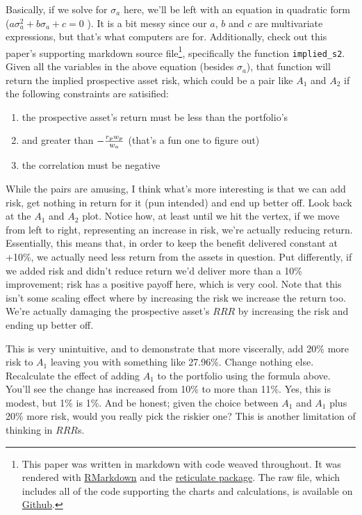 \documentclass[]{article}
\providecommand{\tightlist}{%
  \setlength{\itemsep}{0pt}\setlength{\parskip}{0pt}}
\let\rmarkdownfootnote\footnote%
\def\footnote{\protect\rmarkdownfootnote}
\begin{document}
Basically, if we solve for \(\sigma_a\) here, we'll be left with an
equation in quadratic form (\(a\sigma_a^2 + b\sigma_a + c = 0\) ). It is
a bit messy since our \(a\), \(b\) and \(c\) are multivariate
expressions, but that's what computers are for. Additionally, check out
this paper's supporting markdown source file\footnote{This paper was
  written in markdown with code weaved throughout. It was rendered with
  \href{https://rmarkdown.rstudio.com/}{RMarkdown} and the
  \href{https://rstudio.github.io/reticulate/}{reticulate package}. The
  raw file, which includes all of the code supporting the charts and
  calculations, is available on
  \href{https://github.com/cjken/portfolio-intuition}{Github}.},
specifically the function \texttt{implied\_s2}. Given all the variables
in the above equation (besides \(\sigma_a\)), that function will return
the implied prospective asset risk, which could be a pair like \(A_1\)
and \(A_2\) if the following constraints are satisified:

\begin{enumerate}
\def\labelenumi{\arabic{enumi}.}
\tightlist
\item
  the prospective asset's return must be less than the portfolio's
\item
  and greater than \(-\large{\frac{r_p w_p}{w_a}}\) (that's a fun one to
  figure out)
\item
  the correlation must be negative
\end{enumerate}

While the pairs are amusing, I think what's more interesting is that we
can add risk, get nothing in return for it (pun intended) and end up
better off. Look back at the \(A_1\) and \(A_2\) plot. Notice how, at
least until we hit the vertex, if we move from left to right,
representing an increase in risk, we're actually reducing return.
Essentially, this means that, in order to keep the benefit delivered
constant at +10\%, we actually need less return from the assets in
question. Put differently, if we added risk and didn't reduce return
we'd deliver more than a 10\% improvement; risk has a positive payoff
here, which is very cool. Note that this isn't some scaling effect where
by increasing the risk we increase the return too. We're actually
damaging the prospective asset's \(RRR\) by increasing the risk and
ending up better off.

This is very unintuitive, and to demonstrate that more viscerally, add
20\% more risk to \(A_1\) leaving you with something like 27.96\%.
Change nothing else. Recalculate the effect of adding \(A_1\) to the
portfolio using the formula above. You'll see the change has increased
from 10\% to more than 11\%. Yes, this is modest, but 1\% is 1\%. And be
honest; given the choice between \(A_1\) and \(A_1\) plus 20\% more
risk, would you really pick the riskier one? This is another limitation
of thinking in \(RRR\)s.
\end{document}
